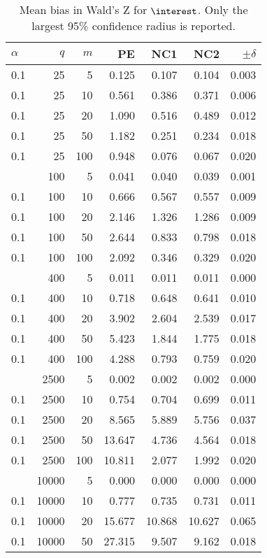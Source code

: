 \begin{table}

\caption{\label{tab:esratiosbias2}Mean bias in Wald's Z for $\interest$. Only the largest 95\% confidence radius is reported.}
\centering
\begin{tabular}[t]{lrrrrrr}
\toprule
$\alpha$ & $q$ & $m$ & PE & NC1 & NC2 & $\pm \delta$\\
\midrule
0.1 & 25 & 5 & 0.125 & 0.107 & 0.104 & 0.003\\
0.1 & 25 & 10 & 0.561 & 0.386 & 0.371 & 0.006\\
0.1 & 25 & 20 & 1.090 & 0.516 & 0.489 & 0.012\\
0.1 & 25 & 50 & 1.182 & 0.251 & 0.234 & 0.018\\
0.1 & 25 & 100 & 0.948 & 0.076 & 0.067 & 0.020\\
\addlinespace
0.1 & 100 & 5 & 0.041 & 0.040 & 0.039 & 0.001\\
0.1 & 100 & 10 & 0.666 & 0.567 & 0.557 & 0.009\\
0.1 & 100 & 20 & 2.146 & 1.326 & 1.286 & 0.009\\
0.1 & 100 & 50 & 2.644 & 0.833 & 0.798 & 0.018\\
0.1 & 100 & 100 & 2.092 & 0.346 & 0.329 & 0.020\\
\addlinespace
0.1 & 400 & 5 & 0.011 & 0.011 & 0.011 & 0.000\\
0.1 & 400 & 10 & 0.718 & 0.648 & 0.641 & 0.010\\
0.1 & 400 & 20 & 3.902 & 2.604 & 2.539 & 0.017\\
0.1 & 400 & 50 & 5.423 & 1.844 & 1.775 & 0.018\\
0.1 & 400 & 100 & 4.288 & 0.793 & 0.759 & 0.020\\
\addlinespace
0.1 & 2500 & 5 & 0.002 & 0.002 & 0.002 & 0.000\\
0.1 & 2500 & 10 & 0.754 & 0.704 & 0.699 & 0.011\\
0.1 & 2500 & 20 & 8.565 & 5.889 & 5.756 & 0.037\\
0.1 & 2500 & 50 & 13.647 & 4.736 & 4.564 & 0.018\\
0.1 & 2500 & 100 & 10.811 & 2.077 & 1.992 & 0.020\\
\addlinespace
0.1 & 10000 & 5 & 0.000 & 0.000 & 0.000 & 0.000\\
0.1 & 10000 & 10 & 0.777 & 0.735 & 0.731 & 0.011\\
0.1 & 10000 & 20 & 15.677 & 10.868 & 10.627 & 0.065\\
0.1 & 10000 & 50 & 27.315 & 9.507 & 9.162 & 0.018\\

\end{tabular}
\end{table}
